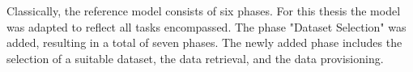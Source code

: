 Classically, the reference model consists of six phases. For this thesis the model was adapted to reflect all tasks encompassed. The phase "Dataset Selection" was added, resulting in a total of seven phases. The newly added phase includes the selection of a suitable dataset, the data retrieval, and the data provisioning.

 